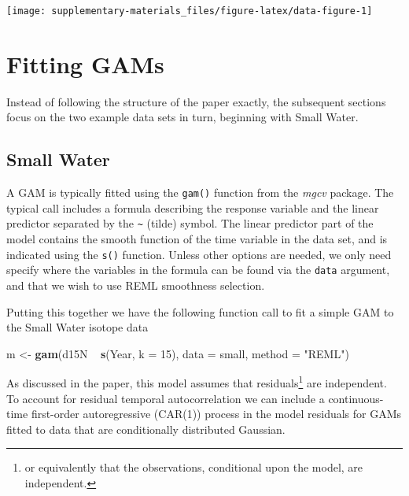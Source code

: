 \documentclass[12pt,]{article}
\newenvironment{Shaded}{\begin{snugshade}}{\end{snugshade}}
\newcommand{\KeywordTok}[1]{\textcolor[rgb]{0.13,0.29,0.53}{\textbf{{#1}}}}
\newcommand{\DataTypeTok}[1]{\textcolor[rgb]{0.13,0.29,0.53}{{#1}}}
\newcommand{\DecValTok}[1]{\textcolor[rgb]{0.00,0.00,0.81}{{#1}}}
\newcommand{\StringTok}[1]{\textcolor[rgb]{0.31,0.60,0.02}{{#1}}}
\newcommand{\NormalTok}[1]{{#1}}
\let\rmarkdownfootnote\footnote%
\def\footnote{\protect\rmarkdownfootnote}
\begin{document}
\begin{center}\texttt{[image: supplementary-materials\_files/figure-latex/data-figure-1]} \end{center}

\section{Fitting GAMs}\label{fitting-gams}

Instead of following the structure of the paper exactly, the subsequent
sections focus on the two example data sets in turn, beginning with
Small Water.

\subsection{Small Water}\label{small-water}

A GAM is typically fitted using the \texttt{gam()} function from the
\emph{mgcv} package. The typical call includes a formula describing the
response variable and the linear predictor separated by the
\texttt{\textasciitilde{}} (tilde) symbol. The linear predictor part of
the model contains the smooth function of the time variable in the data
set, and is indicated using the \texttt{s()} function. Unless other
options are needed, we only need specify where the variables in the
formula can be found via the \texttt{data} argument, and that we wish to
use REML smoothness selection.

Putting this together we have the following function call to fit a
simple GAM to the Small Water isotope data

\begin{Shaded}
\begin{Highlighting}[]
\NormalTok{m <-}\StringTok{ }\KeywordTok{gam}\NormalTok{(d15N ~}\StringTok{ }\KeywordTok{s}\NormalTok{(Year, }\DataTypeTok{k =} \DecValTok{15}\NormalTok{), }\DataTypeTok{data =} \NormalTok{small, }\DataTypeTok{method =} \StringTok{"REML"}\NormalTok{)}
\end{Highlighting}
\end{Shaded}

As discussed in the paper, this model assumes that residuals\footnote{or
  equivalently that the observations, conditional upon the model, are
  independent.} are independent. To account for residual temporal
autocorrelation we can include a continuous-time first-order
autoregressive (CAR(1)) process in the model residuals for GAMs fitted
to data that are conditionally distributed Gaussian.
\end{document}
